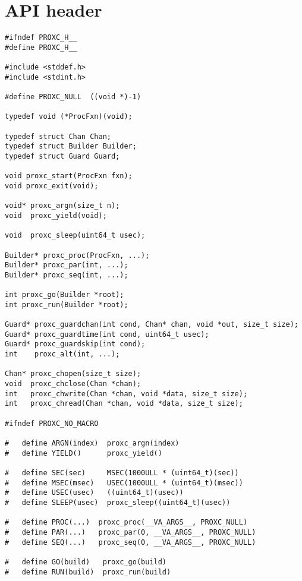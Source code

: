 
\chapter{API header}

\begin{lstlisting}[style=CustomC,caption={API header file for ProXC},label={lst:api_header_file_proxc}]
#ifndef PROXC_H__
#define PROXC_H__

#include <stddef.h>
#include <stdint.h>

#define PROXC_NULL  ((void *)-1)

typedef void (*ProcFxn)(void);

typedef struct Chan Chan;
typedef struct Builder Builder;
typedef struct Guard Guard;

void proxc_start(ProcFxn fxn);
void proxc_exit(void);

void* proxc_argn(size_t n);
void  proxc_yield(void);

void  proxc_sleep(uint64_t usec);

Builder* proxc_proc(ProcFxn, ...);
Builder* proxc_par(int, ...);
Builder* proxc_seq(int, ...);

int proxc_go(Builder *root);
int proxc_run(Builder *root);

Guard* proxc_guardchan(int cond, Chan* chan, void *out, size_t size);
Guard* proxc_guardtime(int cond, uint64_t usec);
Guard* proxc_guardskip(int cond);
int    proxc_alt(int, ...);

Chan* proxc_chopen(size_t size);
void  proxc_chclose(Chan *chan);
int   proxc_chwrite(Chan *chan, void *data, size_t size);
int   proxc_chread(Chan *chan, void *data, size_t size);

#ifndef PROXC_NO_MACRO

#   define ARGN(index)  proxc_argn(index)
#   define YIELD()      proxc_yield()

#   define SEC(sec)     MSEC(1000ULL * (uint64_t)(sec))
#   define MSEC(msec)   USEC(1000ULL * (uint64_t)(msec))
#   define USEC(usec)   ((uint64_t)(usec))
#   define SLEEP(usec)  proxc_sleep((uint64_t)(usec))

#   define PROC(...)  proxc_proc(__VA_ARGS__, PROXC_NULL)
#   define PAR(...)   proxc_par(0, __VA_ARGS__, PROXC_NULL)
#   define SEQ(...)   proxc_seq(0, __VA_ARGS__, PROXC_NULL)

#   define GO(build)   proxc_go(build)
#   define RUN(build)  proxc_run(build)


\end{lstlisting}
